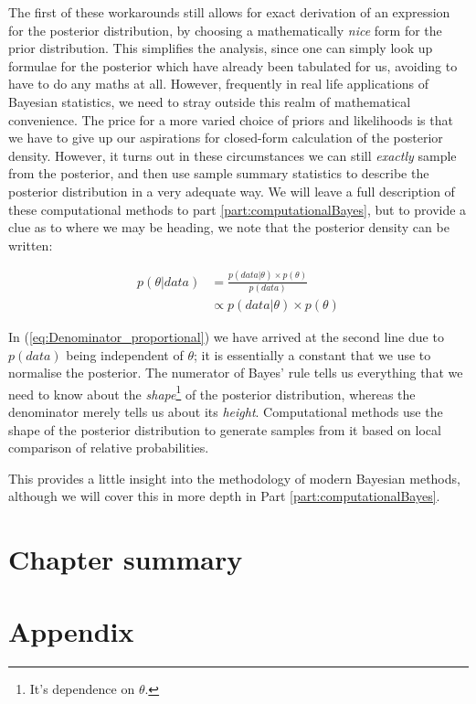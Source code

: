 \documentclass[11pt,fullpage]{book}
\begin{document}
The first of these workarounds still allows for exact derivation of an expression for the posterior distribution, by choosing a mathematically \textit{nice} form for the prior distribution. This simplifies the analysis, since one can simply look up formulae for the posterior which have already been tabulated for us, avoiding to have to do any maths at all. However, frequently in real life applications of Bayesian statistics, we need to stray outside this realm of mathematical convenience. The price for a more varied choice of priors and likelihoods is that we have to give up our aspirations for closed-form calculation of the posterior density. However, it turns out in these circumstances we can still \textit{exactly} sample from the posterior, and then use sample summary statistics to describe the posterior distribution in a very adequate way. We will leave a full description of these computational methods to part \ref{part:computationalBayes}, but to provide a clue as to where we may be heading, we note that the posterior density can be written:

\begin{equation}\label{eq:Denominator_proportional}
\begin{align}
p(\theta|data) &= \frac{p(data|\theta)\times p(\theta)}{p(data)}\\
&\propto p(data|\theta)\times p(\theta)
\end{align}
\end{equation}

In (\ref{eq:Denominator_proportional}) we have arrived at the second line due to $p(data)$ being independent of $\theta$; it is essentially a constant that we use to normalise the posterior. The numerator of Bayes' rule tells us everything that we need to know about the \textit{shape}\footnote{It's dependence on $\theta$.} of the posterior distribution, whereas the denominator merely tells us about its \textit{height}. Computational methods use the shape of the posterior distribution to generate samples from it based on local comparison of relative probabilities. 

This provides a little insight into the methodology of modern Bayesian methods, although we will cover this in more depth in Part \ref{part:computationalBayes}. 

\section{Chapter summary}
\section{Appendix}\label{sec:Denominator_appendix}
\end{document}
